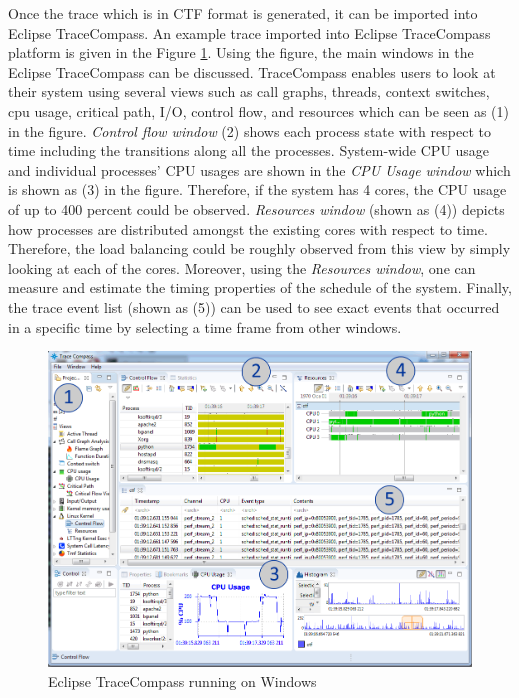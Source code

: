 \begin{itemize}
	Once the trace which is in CTF format is generated, it can be imported into Eclipse TraceCompass. An example trace imported into Eclipse TraceCompass platform is given in the Figure \ref{fig:tracecompass}. Using the figure, the main windows in the Eclipse TraceCompass can be discussed. TraceCompass enables users to look at their system using several views such as call graphs, threads, context switches, cpu usage, critical path, I/O, control flow, and resources which can be seen as (1) in the figure. \textit{Control flow window} (2) shows each process state with respect to time including the transitions along all the processes. System-wide CPU usage and individual processes' CPU usages are shown in the \textit{CPU Usage window} which is shown as (3) in the figure. Therefore, if the system has 4 cores, the CPU usage of up to 400 percent could be observed. \textit{Resources window} (shown as (4)) depicts how processes are distributed amongst the existing cores with respect to time. Therefore, the load balancing could be roughly observed from this view by simply looking at each of the cores. Moreover, using the \textit{Resources window}, one can measure and estimate the timing properties of the schedule of the system. Finally, the trace event list (shown as (5)) can be used to see exact events that occurred in a specific time by selecting a time frame from other windows.
	\begin{figure}[!ht]
		\centering
		\captionsetup{justification=centering}
		\includegraphics[scale=0.40]{content/images/tracecompass.png}
		\caption{Eclipse TraceCompass running on Windows}
		\label{fig:tracecompass}
	\end{figure}


\end{itemize}
